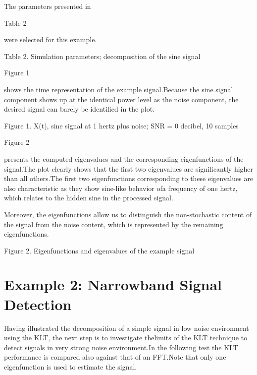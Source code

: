 \documentclass[12pt]{report}
\begin{document}
The parameters presented in \begin{normalsize}\color{red}Table 2\end{normalsize} were selected for this example.
\begin{center}
	\color{blue}Table 2. Simulation parameters; decomposition of the sine signal
\end{center}
\begin{normalsize}\color{red}Figure 1\end{normalsize} shows the time representation of the example signal.\@ Because the sine signal component shows up at the identical power level as the noise component, the desired signal can barely be identified in the plot.
\begin{center}
	\color{blue}Figure 1. X(t), sine signal at 1 hertz plus noise; SNR = 0 decibel, 10 samples
\end{center}
\begin{normalsize}\color{red}Figure 2\end{normalsize} presents the computed eigenvalues and the corresponding eigenfunctions of the signal.\@ The plot clearly shows that the first two eigenvalues are significantly higher than all others.\@ The first two eigenfunctions corresponding to these eigenvalues are also characteristic as they show sine-like behavior ofa frequency of one hertz, which relates to the hidden sine in the processed signal.

Moreover, the eigenfunctions allow us to distinguish the non-stochastic content of the signal from the noise content, which is represented by the remaining eigenfunctions.
\begin{center}
	\color{blue}Figure 2. Eigenfunctions and eigenvalues of the example signal
\end{center}
\section*{Example 2: Narrowband Signal Detection}
Having illustrated the decomposition of a simple signal in low noise environment using the KLT, the next step is to investigate thelimits of the KLT technique to detect signals in very strong noise environment.\@ In the following test the KLT performance is compared also against that of an FFT.\@ Note that only one eigenfunction is used to estimate the signal.
\end{document}

